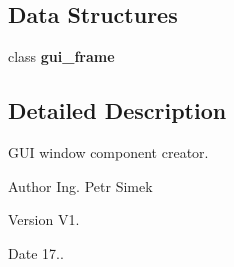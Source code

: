 \subsection*{Data Structures}
\begin{DoxyCompactItemize}
\item 
class \textbf{ gui\+\_\+frame}
\end{DoxyCompactItemize}


\subsection{Detailed Description}
G\+UI window component creator. 

\begin{DoxyAuthor}{Author}
Ing. Petr Simek 
\end{DoxyAuthor}
\begin{DoxyVersion}{Version}
V1. 
\end{DoxyVersion}
\begin{DoxyDate}{Date}
17.. 
\end{DoxyDate}
